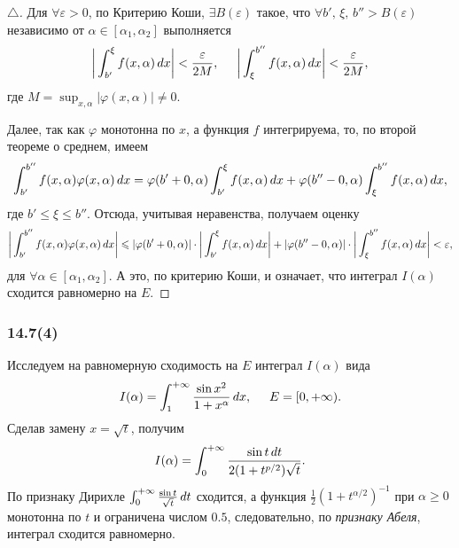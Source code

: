 \begin{proof}[$\triangle$]

Для $\forall \varepsilon > 0$, по Критерию Коши, $\exists B(\varepsilon)$ такое, что $\forall b',\, \xi,\, b'' > B(\varepsilon)$ независимо от $\alpha \in [\alpha_1, \alpha_2]$ выполняется 
\begin{equation*}
    \bigg|
        \int_{b'}^{\xi} f(x ,\alpha) \, d x
    \bigg| < \frac{\varepsilon}{2M},
    \hspace{5 mm}
    \bigg|
        \int_{\xi}^{b''} f(x, \alpha) \, d x
    \bigg| < \frac{\varepsilon}{2M},
\end{equation*}
где $M = \sup_{x, \alpha} | \varphi(x, \alpha)| \neq 0$.


Далее, так как $\varphi$ монотонна по $x$, а функция $f$ интегрируема, то, по второй теореме о среднем, имеем
\begin{equation*}
    \int_{b'}^{b''} f(x, \alpha) \varphi(x, \alpha) \, d x = \varphi(b' + 0, \alpha) 
    \int_{b'}^{\xi} f(x, \alpha) \, d x +
    \varphi(b'' - 0, \alpha) \int_\xi^{b''} f(x, \alpha) \, d x,
\end{equation*}
где  $b' \leq \xi \leq b''$. Отсюда, учитывая неравенства, получаем оценку
\begin{equation*}
    \bigg|
        \int_{b'}^{b''} f(x, \alpha) \varphi(x, \alpha) \, d x
    \bigg| \leqslant |\varphi(b' + 0, \alpha)| \cdot 
    \bigg|
        \int_{b'}^{\xi} f(x, \alpha) \, d x
    \bigg| + 
    |\varphi(b'' - 0, \alpha)| \cdot \bigg|
        \int_{\xi}^{b''} f(x, \alpha) \, d x
    \bigg| < \varepsilon,
\end{equation*}
для $\forall \alpha \in [\alpha_1, \alpha_2]$. А это, по критерию Коши, и означает, что интеграл $I(\alpha)$ сходится равномерно на $E$.
\end{proof}





\subsubsection*{14.7(4)}

Исследуем на равномерную сходимость на $E$ интеграл $I(\alpha)$ вида
\begin{equation*}
    I(\alpha) = \int_1^{+\infty} \frac{\sin x^2}{1 + x^\alpha}\, d x,
    \hspace{5 mm} E = [0, +\infty).
\end{equation*}
Сделав замену $x = \sqrt{t}$, получим
\begin{equation*}
    I(\alpha) = \int_0^{+\infty} \frac{\sin t \, d t}{2 (1 + t^{p/2}) \sqrt{t}}.
\end{equation*}
По признаку Дирихле $\int_0^{+\infty} \frac{\sin t}{\sqrt{t}} \, d t$ сходится, а функция
$\frac{1}{2} \left(1 + t^{\alpha/2}\right)^{-1}$ при $\alpha \geq 0$ монотонна по $t$ и ограничена числом $0.5$, следовательно, по \textit{признаку Абеля}, интеграл сходится равномерно.





